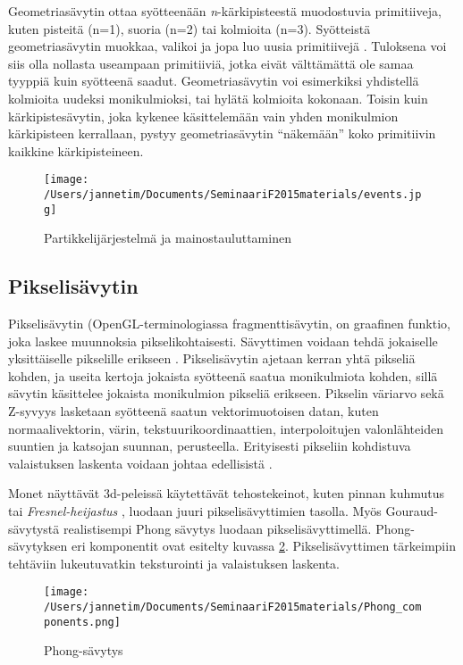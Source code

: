 \documentclass[finnish]{tktltiki2}
\theoremstyle{definition}
\theoremstyle{remark}
\begin{document}
Geometriasävytin ottaa syötteenään \emph{n}-kärkipisteestä muodostuvia primitiiveja, kuten pisteitä (n=1), suoria (n=2) tai kolmioita (n=3). Syötteistä geometriasävytin muokkaa, valikoi ja jopa luo uusia primitiivejä \cite{Gre14}. Tuloksena voi siis olla nollasta useampaan primitiiviä, jotka eivät välttämättä ole samaa tyyppiä kuin syötteenä saadut. Geometriasävytin voi esimerkiksi yhdistellä kolmioita uudeksi monikulmioksi, tai hylätä kolmioita kokonaan. Toisin kuin kärkipistesävytin, joka kykenee käsittelemään vain yhden monikulmion kärkipisteen kerrallaan, pystyy geometriasävytin ``näkemään'' koko primitiivin kaikkine kärkipisteineen.

\begin{figure}[!htpb]
\texttt{[image: /Users/jannetim/Documents/SeminaariF2015materials/events.jpg]}
\caption{Partikkelijärjestelmä ja mainostauluttaminen}
\label{billboard}
\end{figure}

\subsection{Pikselisävytin}

Pikselisävytin (OpenGL-terminologiassa fragmenttisävytin, on graafinen funktio, joka laskee muunnoksia pikselikohtaisesti. Sävyttimen voidaan tehdä jokaiselle yksittäiselle pikselille erikseen \cite{}. Pikselisävytin ajetaan kerran yhtä pikseliä kohden, ja useita kertoja jokaista syötteenä saatua monikulmiota kohden, sillä sävytin käsittelee jokaista monikulmion pikseliä erikseen. Pikselin väriarvo sekä Z-syvyys lasketaan syötteenä saatun vektorimuotoisen datan, kuten normaalivektorin, värin, tekstuurikoordinaattien, interpoloitujen valonlähteiden suuntien ja katsojan suunnan, perusteella. Erityisesti pikseliin kohdistuva valaistuksen laskenta voidaan johtaa edellisistä \cite{Puh08}.

Monet näyttävät 3d-peleissä käytettävät tehostekeinot, kuten pinnan kuhmutus tai \emph{Fresnel-heijastus} \cite{Laz05}, luodaan juuri pikselisävyttimien tasolla. Myös Gouraud-sävytystä realistisempi Phong sävytys luodaan pikselisävyttimellä. Phong-sävytyksen eri komponentit ovat esitelty kuvassa \ref{Phong}. Pikselisävyttimen tärkeimpiin tehtäviin lukeutuvatkin teksturointi ja valaistuksen laskenta.

\begin{figure}[!htbp]
\texttt{[image: /Users/jannetim/Documents/SeminaariF2015materials/Phong\_components.png]}
\caption{Phong-sävytys}
\label{Phong}
\end{figure}
\end{document}
